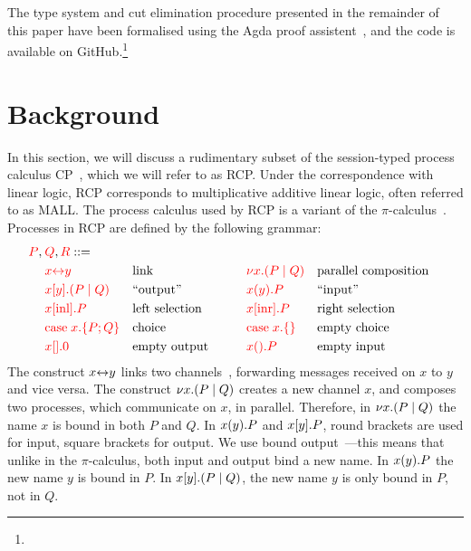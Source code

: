 \documentclass[a4paper,UKenglish]{lipics-v2016}
\begin{document}
The type system and cut elimination procedure presented in the remainder of this
paper have been formalised using the Agda proof assistent~\cite{norell2009}, and
the code is available on GitHub.\footnote{
}

\section{Background}
In this section, we will discuss a rudimentary subset of the session-typed
process calculus CP~\cite{wadler2012}, which we will refer to as RCP.
Under the correspondence with linear logic, RCP corresponds to multiplicative
additive linear logic, often referred to as MALL.
The process calculus used by RCP is a variant of the
$\pi$-calculus~\cite{milner1992b}. Processes in RCP are defined by
the following grammar:
\[
  \begin{aligned}
    \red{P},\:&\red{Q},\red{R} ::=\\
    &       \red{\link{x}{y}}           &&\text{link}
    &\qquad&\red{\cut{x}(P \mid Q)}     &&\text{parallel composition}\\
    &       \red{\send{x}{y}(P \mid Q)} &&\text{``output''}
    &\qquad&\red{\recv{x}{y}P}          &&\text{``input''}\\
    &       \red{\inl{x}P}              &&\text{left selection}
    &\qquad&\red{\inr{x}P}              &&\text{right selection}\\
    &       \red{\case{x}{P}{Q}}        &&\text{choice}
    &\qquad&\red{\case{x}{}{}}          &&\text{empty choice}\\
    &       \red{\send{x}{}0}           &&\text{empty output}
    &\qquad&\red{\recv{x}{}P}           &&\text{empty input}\\
  \end{aligned}
\]
The construct ${x{\leftrightarrow}y}$ links two channels~\cite{sangiorgi1996,boreale1998},
forwarding messages received on $x$ to $y$ and vice versa.
%
The construct ${\nu x.}{(P \mid Q)}$ creates a new channel $x$, and composes two
processes, which communicate on $x$, in parallel.
Therefore, in ${\nu x.}{(P \mid Q)}$ the name $x$ is bound in both $P$ and $Q$.
%
In ${x(y).}P$ and ${x[y].}P$, round brackets are used for input, square
brackets for output. 
We use bound output~\cite{sangiorgi1996}---this means that unlike in the
$\pi$-calculus, both input and output bind a new name.
In ${x(y).}P$ the new name $y$ is bound in $P$.
In ${x[y].}{(P \mid Q)}$, the new name $y$ is only bound in $P$, not in $Q$.
\end{document}
